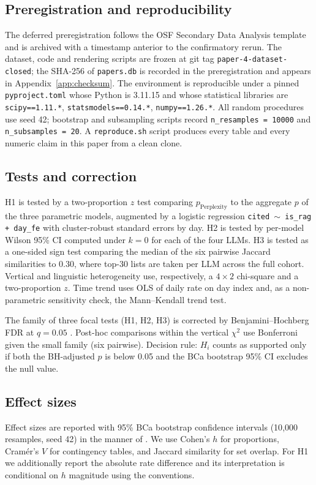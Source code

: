 \documentclass[preprint,12pt,authoryear]{elsarticle}
\begin{document}
\subsection{Preregistration and reproducibility}
The deferred preregistration follows the OSF Secondary Data Analysis template and is archived with a timestamp anterior to the confirmatory rerun. The dataset, code and rendering scripts are frozen at git tag \texttt{paper-4-dataset-closed}; the SHA-256 of \texttt{papers.db} is recorded in the preregistration and appears in Appendix~\ref{app:checksum}. The environment is reproducible under a pinned \texttt{pyproject.toml} whose Python is 3.11.15 and whose statistical libraries are \texttt{scipy==1.11.*}, \texttt{statsmodels==0.14.*}, \texttt{numpy==1.26.*}. All random procedures use seed 42; bootstrap and subsampling scripts record \texttt{n\_resamples\,=\,10000} and \texttt{n\_subsamples\,=\,20}. A \texttt{reproduce.sh} script produces every table and every numeric claim in this paper from a clean clone.

\subsection{Tests and correction}
H1 is tested by a two-proportion $z$ test comparing $p_{\text{Perplexity}}$ to the aggregate $p$ of the three parametric models, augmented by a logistic regression \texttt{cited\,$\sim$\,is\_rag + day\_fe} with cluster-robust standard errors by day. H2 is tested by per-model Wilson 95\% CI computed under $k=0$ for each of the four LLMs. H3 is tested as a one-sided sign test comparing the median of the six pairwise Jaccard similarities to 0.30, where top-30 lists are taken per LLM across the full cohort. Vertical and linguistic heterogeneity use, respectively, a $4\times 2$ chi-square and a two-proportion $z$. Time trend uses OLS of daily rate on day index and, as a non-parametric sensitivity check, the Mann--Kendall trend test.

The family of three focal tests (H1, H2, H3) is corrected by Benjamini--Hochberg FDR at $q=0.05$ \citep{Benjamini1995}. Post-hoc comparisons within the vertical $\chi^2$ use Bonferroni given the small family (six pairwise). Decision rule: $H_i$ counts as supported only if both the BH-adjusted $p$ is below 0.05 and the BCa bootstrap 95\% CI excludes the null value.

\subsection{Effect sizes}
Effect sizes are reported with 95\% BCa bootstrap confidence intervals (10{,}000 resamples, seed 42) in the manner of \citet{Efron1987}. We use Cohen's $h$ for proportions, Cram\'er's $V$ for contingency tables, and Jaccard similarity for set overlap. For H1 we additionally report the absolute rate difference and its interpretation is conditional on $h$ magnitude using the \citet{Cohen1988} conventions.
\end{document}
